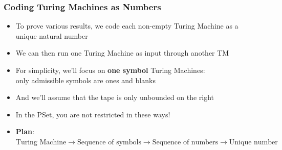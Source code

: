 \begin{frame}
\frametitle{Coding Turing Machines as Numbers}

\begin{itemize}[<+->]

\item To prove various results, we code each non-empty Turing Machine as a unique natural number

\item We can then run one Turing Machine as input through another TM

\item For simplicity, we'll focus on \textbf{one symbol} Turing Machines: \\ only admissible symbols are ones and blanks

\item[] And we'll assume that the tape is only unbounded on the right

\item[] In the PSet, you are not restricted in these ways! 

\item \textbf{Plan}: $\text{Turing Machine} \rightarrow \text{Sequence of symbols} \rightarrow
\text{Sequence of numbers} \rightarrow  \text{Unique number}$


\end{itemize}
\end{frame}

